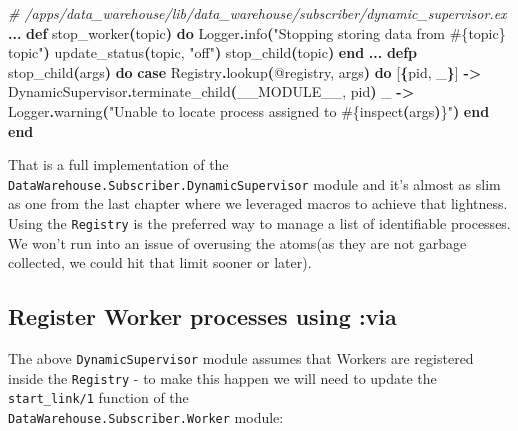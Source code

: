 \documentclass[
  oneside]{book}
\newenvironment{Shaded}{\begin{snugshade}}{\end{snugshade}}
\newcommand{\CommentTok}[1]{\textcolor[rgb]{0.56,0.35,0.01}{\textit{#1}}}
\newcommand{\ConstantTok}[1]{\textcolor[rgb]{0.56,0.35,0.01}{#1}}
\newcommand{\FunctionTok}[1]{\textcolor[rgb]{0.13,0.29,0.53}{\textbf{#1}}}
\newcommand{\KeywordTok}[1]{\textcolor[rgb]{0.13,0.29,0.53}{\textbf{#1}}}
\newcommand{\NormalTok}[1]{#1}
\newcommand{\OperatorTok}[1]{\textcolor[rgb]{0.81,0.36,0.00}{\textbf{#1}}}
\newcommand{\OtherTok}[1]{\textcolor[rgb]{0.56,0.35,0.01}{#1}}
\newcommand{\StringTok}[1]{\textcolor[rgb]{0.31,0.60,0.02}{#1}}
\begin{document}
\begin{Shaded}
\begin{Highlighting}[]
  \CommentTok{\# /apps/data\_warehouse/lib/data\_warehouse/subscriber/dynamic\_supervisor.ex}
  \OperatorTok{...}
  \KeywordTok{def}\NormalTok{ stop\_worker}\FunctionTok{(}\NormalTok{topic}\FunctionTok{)} \KeywordTok{do}
    \ConstantTok{Logger}\OperatorTok{.}\NormalTok{info}\FunctionTok{(}\StringTok{"Stopping storing data from }\OtherTok{\#\{}\NormalTok{topic}\OtherTok{\}}\StringTok{ topic"}\FunctionTok{)}
\NormalTok{    update\_status}\FunctionTok{(}\NormalTok{topic, }\StringTok{"off"}\FunctionTok{)}
\NormalTok{    stop\_child}\FunctionTok{(}\NormalTok{topic}\FunctionTok{)}
  \KeywordTok{end}
  \OperatorTok{...}
  \KeywordTok{defp}\NormalTok{ stop\_child}\FunctionTok{(}\NormalTok{args}\FunctionTok{)} \KeywordTok{do}
    \KeywordTok{case} \ConstantTok{Registry}\OperatorTok{.}\NormalTok{lookup}\FunctionTok{(}\OtherTok{@registry}\NormalTok{, args}\FunctionTok{)} \KeywordTok{do}
      \OtherTok{[}\FunctionTok{\{}\NormalTok{pid, \_}\FunctionTok{\}}\OtherTok{]} \OperatorTok{{-}\textgreater{}} \ConstantTok{DynamicSupervisor}\OperatorTok{.}\NormalTok{terminate\_child}\FunctionTok{(}\ConstantTok{\_\_MODULE\_\_}\NormalTok{, pid}\FunctionTok{)}
\NormalTok{      \_ }\OperatorTok{{-}\textgreater{}} \ConstantTok{Logger}\OperatorTok{.}\NormalTok{warning}\FunctionTok{(}\StringTok{"Unable to locate process assigned to }\OtherTok{\#\{}\NormalTok{inspect}\FunctionTok{(}\NormalTok{args}\FunctionTok{)}\OtherTok{\}}\StringTok{"}\FunctionTok{)}
    \KeywordTok{end}
  \KeywordTok{end}
\end{Highlighting}
\end{Shaded}

That is a full implementation of the \texttt{DataWarehouse.Subscriber.DynamicSupervisor} module and it's almost as slim as one from the last chapter where we leveraged macros to achieve that lightness. Using the \texttt{Registry} is the preferred way to manage a list of identifiable processes. We won't run into an issue of overusing the atoms(as they are not garbage collected, we could hit that limit sooner or later).

\subsection{Register Worker processes using :via}\label{register-worker-processes-using-via}

The above \texttt{DynamicSupervisor} module assumes that Workers are registered inside the \texttt{Registry} - to make this happen we will need to update the \texttt{start\_link/1} function of the\\
\texttt{DataWarehouse.Subscriber.Worker} module:
\end{document}
